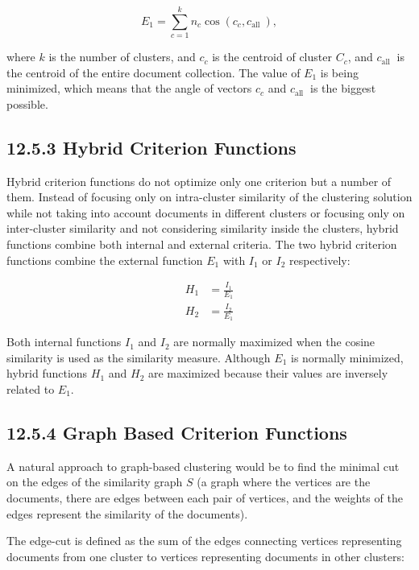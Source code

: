 \documentclass[10pt]{book}
\begin{document}
\begin{equation*}
E_{1}=\sum_{c=1}^{k} n_{c} \cos \left(c_{c}, c_{\text {all }}\right), \tag{12.17}
\end{equation*}


where $k$ is the number of clusters, and $c_{c}$ is the centroid of cluster $C_{c}$, and $c_{\text {all }}$ is the centroid of the entire document collection. The value of $E_{1}$ is being minimized, which means that the angle of vectors $c_{c}$ and $c_{\text {all }}$ is the biggest possible.

\subsection*{12.5.3 Hybrid Criterion Functions}
Hybrid criterion functions do not optimize only one criterion but a number of them. Instead of focusing only on intra-cluster similarity of the clustering solution while not taking into account documents in different clusters or focusing only on inter-cluster similarity and not considering similarity inside the clusters, hybrid functions combine both internal and external criteria. The two hybrid criterion functions combine the external function $E_{1}$ with $I_{1}$ or $I_{2}$ respectively:


\begin{align*}
H_{1} & =\frac{I_{1}}{E_{1}}  \tag{12.18}\\
H_{2} & =\frac{I_{2}}{E_{1}} \tag{12.19}
\end{align*}


Both internal functions $I_{1}$ and $I_{2}$ are normally maximized when the cosine similarity is used as the similarity measure. Although $E_{1}$ is normally minimized, hybrid functions $H_{1}$ and $H_{2}$ are maximized because their values are inversely related to $E_{1}$.

\subsection*{12.5.4 Graph Based Criterion Functions}
A natural approach to graph-based clustering would be to find the minimal cut on the edges of the similarity graph $S$ (a graph where the vertices are the documents, there are edges between each pair of vertices, and the weights of the edges represent the similarity of the documents).

The edge-cut is defined as the sum of the edges connecting vertices representing documents from one cluster to vertices representing documents in other clusters:
\end{document}
